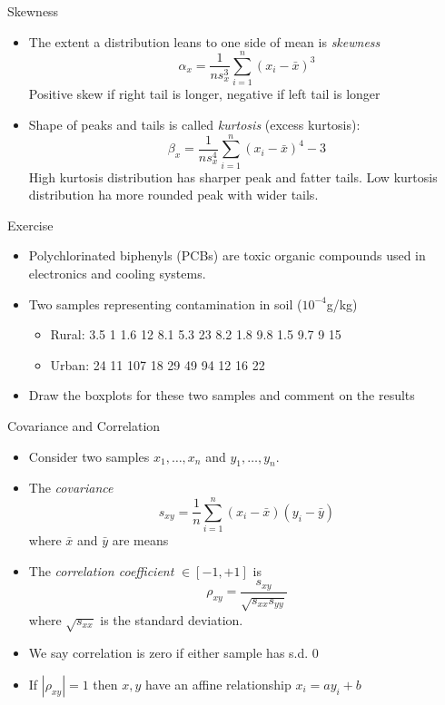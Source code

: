 \documentclass{beamer}
\begin{document}
\begin{frame}{Skewness}  
\begin{itemize} 
 \item The extent a distribution leans to one side of mean is \emph{skewness} 
\begin{displaymath} 
 \alpha_x = \frac{1}{ns^3_x} \sum_{i=1}^n (x_i - \bar{x})^3
\end{displaymath}
Positive skew if right tail is longer, negative if left tail is longer 
\item Shape of peaks and tails is called \emph{kurtosis} (excess kurtosis):
\begin{displaymath} 
 \beta_x = \frac{1}{ns^4_x} \sum_{i=1}^n (x_i - \bar{x})^4 - 3
\end{displaymath}
High kurtosis distribution has sharper peak and fatter tails. Low kurtosis distribution ha more rounded peak with wider tails. 
\end{itemize}
 
\end{frame}


\begin{frame}{Exercise}  
\begin{itemize} 
 \item Polychlorinated biphenyls (PCBs) are toxic organic compounds used in electronics and cooling systems. 
 \item Two samples representing contamination in soil ($10^{-4}$g/kg)
 \begin{itemize}
 \item Rural: 3.5 1 1.6 12 8.1 5.3 23 8.2 1.8 9.8 1.5 9.7 9 15
 \item Urban: 24 11 107 18 29 49 94 12 16 22 
 \end{itemize}
 \item Draw the boxplots for these two samples and comment on the results
\end{itemize}
\end{frame}

\begin{frame}{Covariance and Correlation}
\begin{itemize} 
 \item Consider two samples $x_1, \ldots, x_n$ and $y_1, \ldots, y_n$. 
  \item The \emph{covariance}
 \begin{displaymath} 
  s_{xy} = \frac{1}{n} \sum_{i=1}^n (x_i - \bar{x})(y_i - \bar{y}) 
 \end{displaymath}
  where $\bar{x}$ and $\bar{y}$ are means 
 \item The \emph{correlation coefficient} $\in [-1, +1]$ is 
 \begin{displaymath}
  \rho_{xy} = \frac{s_{xy}}{\sqrt{s_{xx}s_{yy}}}
 \end{displaymath}
  where $\sqrt{s_{xx}}$ is the standard deviation. 
 \item We say correlation is zero if either sample has s.d. 0 
 \item If $|\rho_{xy}| = 1$ then $x, y$ have an affine relationship $x_i = a y_i + b$ 
\end{itemize}
\end{frame}
\end{document}
